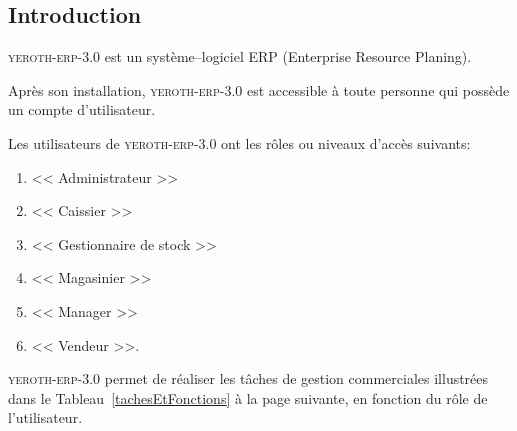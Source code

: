 \documentclass[a4paper, 10pt]{article}
\newcommand{\yeroth}{\textsc{yeroth-erp-3.0}\xspace}
\newcommand{\manager}{<< Manager >>\xspace}
\newcommand{\caissier}{<< Caissier >>\xspace}
\newcommand{\administrateur}{<< Administrateur >>\xspace}
\newcommand{\magasinier}{<< Magasinier >>\xspace}
\newcommand{\vendeur}{<< Vendeur >>\xspace}
\newcommand{\gestionairedestocks}{<< Gestionnaire de stock >>\xspace}
\begin{document}
\begin{multicols}{2}





\vspace{-1.3em}
\section{Introduction}
\vspace{-0.3em}
\yeroth est un syst\`eme--logiciel ERP (Enterprise Resource Planing).

Apr\`es son installation, \yeroth est accessible \`a
toute personne qui poss\`ede un compte d'utilisateur.

Les utilisateurs de \yeroth ont les r\^oles ou 
niveaux d'acc\`es suivants:
\begin{enumerate}[1.]
	\itemsep -0.3em
	\item \administrateur
	\item \caissier	
	\item \gestionairedestocks
	\item \magasinier	
	\item \manager
	\item \vendeur.
\end{enumerate}

\yeroth permet de r\'ealiser les t\^aches de gestion
commerciales illustr\'ees dans
le Tableau~\ref{tachesEtFonctions} \`a la page suivante,
en fonction du r\^ole de l'utilisateur.

\vspace{-1.0em}

\end{multicols}
\end{document}

